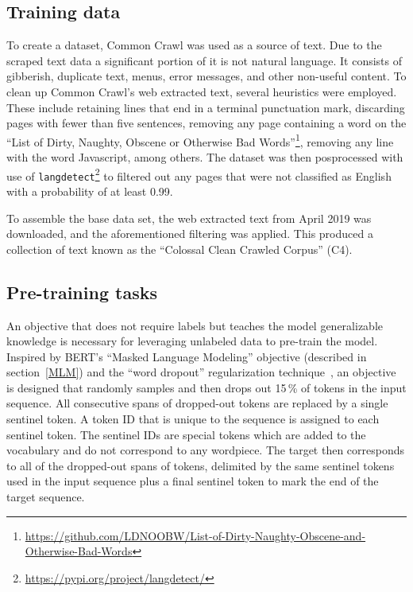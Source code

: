 \subsection*{Training data}
To create a dataset, Common Crawl was used as a source of text. Due to the scraped text data a significant portion of it is not natural language. It consists of gibberish, duplicate text, menus, error messages, and other non-useful content. To clean up Common Crawl’s web extracted text, several heuristics were employed. These include retaining lines that end in a terminal punctuation mark, discarding pages with fewer than five sentences, removing any page containing a word on the ``List of Dirty, Naughty, Obscene or Otherwise Bad Words''\footnote{\url{https://github.com/LDNOOBW/List-of-Dirty-Naughty-Obscene-and-Otherwise-Bad-Words}}, removing any line with the word Javascript, among others. The dataset was then posprocessed with use of \texttt{langdetect}\footnote{\url{https://pypi.org/project/langdetect/}} to filtered out any pages that were not classified as English with a probability of at least 0.99.

To assemble the base data set, the web extracted text from April 2019 was downloaded, and the aforementioned filtering was applied. This produced a collection of text known as the ``Colossal Clean Crawled Corpus'' (C4).

\subsection*{Pre-training tasks}\label{t5_pretraining}
An objective that does not require labels but teaches the model generalizable knowledge is necessary for leveraging unlabeled data to pre-train the model. Inspired by BERT’s “Masked Language Modeling” objective (described in section~\ref{MLM}) and the “word dropout” regularization technique~\cite{regularization}, an objective is designed that randomly samples and then drops out 15\,\% of tokens in the input sequence. All consecutive spans of dropped-out tokens are replaced by a single sentinel token. A token ID that is unique to the sequence is assigned to each sentinel token. The sentinel IDs are special tokens which are added to the vocabulary and do not correspond to any wordpiece. The target then corresponds to all of the dropped-out spans of tokens, delimited by the same sentinel tokens used in the input sequence plus a final sentinel token to mark the end of the target sequence.

